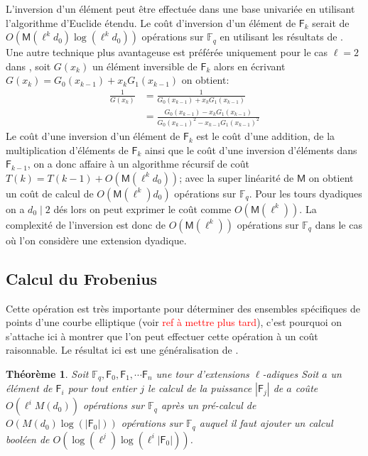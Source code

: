 \documentclass[10pt,a4paper]{book}
\theoremstyle{plain}
\newtheorem{thm}{Théorème}[chapter]
\theoremstyle{definition}
\theoremstyle{definition}
\theoremstyle{definition}
\theoremstyle{definition}
\theoremstyle{remark}
\theoremstyle{remark}
\theoremstyle{definition}
\begin{document}
L'inversion d'un élément peut être effectuée dans une base univariée en utilisant l'algorithme d'Euclide étendu. Le coût d'inversion d'un élément de $\mathsf{F}_k$ serait de $O(\mathsf{M}(\ell^kd_0)\log(\ell^kd_0))$ opérations sur $\mathbb{F}_q$ en utilisant les résultats de \cite[ch.11]{vzGJG03}. Une autre technique plus avantageuse est préférée uniquement pour le cas $\ell=2$ dans \cite{Doliskani-Schost15}, soit $G(x_k)$ un élément inversible de $\mathsf{F}_k$ alors en écrivant $G(x_k)=G_0(x_{k-1})+x_kG_1(x_{k-1})$ on obtient:
\begin{align*}
\frac{1}{G(x_k)} &=\frac{1}{G_0(x_{k-1})+x_kG_1(x_{k-1})} \\
 				&= \frac{G_0(x_{k-1})-x_kG_1(x_{k-1})}{G_0(x_{k-1})^2-x_{k-1}G_1(x_{k-1})^2}
\end{align*}
Le coût d'une inversion d'un élément de $\mathsf{F}_k$ est le coût d'une addition, de la multiplication d'éléments de $\mathsf{F}_k$ ainsi que le coût d'une inversion d'éléments dans $\mathsf{F}_{k-1}$, on a donc affaire à un algorithme récursif de coût  $T(k)=T(k-1)+O(\mathsf{M}(\ell^kd_0))$; avec la super linéarité de $\mathsf{M}$ on obtient un coût de calcul de $O(\mathsf{M}(\ell^k)d_0)$ opérations sur $\mathbb{F}_q$. Pour les tours dyadiques on a $d_0 \mid 2$ dés lors on peut exprimer le coût comme $O(\mathsf{M}(\ell^k))$. La complexité de l'inversion est donc de $O(\mathsf{M}(\ell^k))$ opérations sur $\mathbb{F}_q$ dans le cas où l'on considère une extension dyadique.

\subsection*{Calcul du Frobenius}

Cette opération est très importante pour déterminer des ensembles spécifiques de points d'une courbe elliptique (voir \textcolor{red}{ref à mettre plus tard}), c'est pourquoi on s'attache ici à montrer que l'on peut effectuer cette opération à un coût raisonnable. Le résultat ici est une généralisation de \cite{Doliskani-Schost15}.

\begin{thm} \label{thm:frob-ell}
Soit $\mathbb{F}_q, \mathsf{F}_0, \mathsf{F}_1,  \cdots \mathsf{F}_n$ une tour d'extensions $\ell$-adiques
Soit $a$ un élément de $\mathsf{F}_i$ pour tout entier $j$ le calcul de la puissance $|\mathsf{F}_j|$ de $a$ coûte
 $O(\ell^{i}M(d_0))$ opérations sur $\mathbb{F}_q$ après un pré-calcul de $O( M(d_0)\log(|\mathsf{F}_0|))$ opérations sur $\mathbb{F}_q$
auquel il faut ajouter un calcul booléen de $O(\log(\ell^j)\log(\ell^i|\mathsf{F}_0|))$.
\end{thm} 
\end{document}
